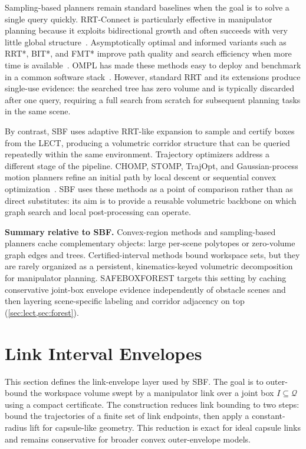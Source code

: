 \documentclass[journal]{IEEEtran}
\DeclareRobustCommand{\textsc}[1]{\textnormal{\MakeUppercase{#1}}}
\newcommand{\sbf}{\textsc{SBF}}
\newcommand{\Q}{\ensuremath{\mathcal{Q}}}
\begin{document}
Sampling-based planners remain standard baselines when the goal is to solve
a single query quickly. RRT-Connect is particularly effective in manipulator
planning because it exploits bidirectional growth and often succeeds with very
little global structure~\cite{kuffner2000rrt}. Asymptotically optimal and
informed variants such as RRT*, BIT*, and FMT* improve path quality and search
efficiency when more time is available~\cite{karaman2011sampling,
gammell2015batch,gammell2018informed,janson2015fmt}. OMPL has made these
methods easy to deploy and benchmark in a common software stack~\cite{sucan2012ompl,
moll2015benchmarking}. However, standard RRT and its extensions produce single-use
evidence: the searched tree has zero volume and is typically discarded after one
query, requiring a full search from scratch for subsequent planning tasks in
the same scene.

By contrast, SBF uses adaptive RRT-like expansion to sample and certify boxes
from the LECT, producing a volumetric corridor structure that can be queried
repeatedly within the same environment.
Trajectory optimizers address a different stage of the pipeline. CHOMP, STOMP,
TrajOpt, and Gaussian-process motion planners refine an initial path by local
descent or sequential convex optimization~\cite{ratliff2009chomp,
kalakrishnan2011stomp,schulman2014motion,mukadam2018gpmp2}. SBF uses these
methods as a point of comparison rather than as direct substitutes: its aim is
to provide a reusable volumetric backbone on which graph search and local
post-processing can operate.

\textbf{Summary relative to \sbf.}
Convex-region methods and sampling-based planners cache complementary objects:
large per-scene polytopes or zero-volume graph edges and trees.
Certified-interval methods bound workspace sets, but they are rarely organized
as a persistent, kinematics-keyed volumetric decomposition for manipulator
planning. \textsc{SafeBoxForest} targets this setting by caching conservative
joint-box envelope evidence independently of obstacle scenes and then layering
scene-specific labeling and corridor adjacency on top (\cref{sec:lect,sec:forest}).

\section{Link Interval Envelopes}\label{sec:link_envelopes}

This section defines the link-envelope layer used by \sbf{}. The goal is to
outer-bound the workspace volume swept by a manipulator link over a joint box
$I \subseteq \Q$ using a compact certificate. The construction reduces link
bounding to two steps: bound the trajectories of a finite set of link endpoints,
then apply a constant-radius lift for capsule-like geometry. This reduction is
exact for ideal capsule links and remains conservative for broader convex
outer-envelope models.
\end{document}
